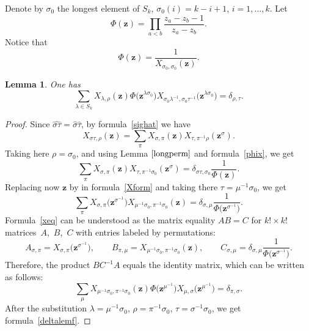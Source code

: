 \documentclass[10pt,a4paper]{amsart}
\numberwithin{equation}{section}
\newtheorem{Lemma}[Theorem]{Lemma}
\begin{document}
Denote by $\sigma_0$ the longest element of $S_k$, $\sigma_0(i)=k-i+1$, $i=1,\dots,k$. Let
\begin{equation*}
\Phi(\boldsymbol{z})=\prod_{a<b}\frac{z_a-z_b-1}{z_a-z_b}.
\end{equation*}
Notice that
\begin{equation}\label{phix}
\Phi(\boldsymbol{z})=\frac{1}{X_{\sigma_0,\sigma_0}(\boldsymbol{z})}.
\end{equation}
\begin{Lemma}\label{deltalem}One has
\begin{equation} \label{deltalemf}
\sum_{\lambda\in S_k} X_{\lambda,\rho}(\boldsymbol{z})\Phi\bigl(\boldsymbol{z}^{\lambda\sigma_0}\bigr)X_{\sigma_0\lambda^{-1},\sigma_0\tau^{-1}}\bigl(\boldsymbol{z}^{\lambda\sigma_0}\bigr)=\delta_{\rho,\tau}.
\end{equation}
\end{Lemma}
\begin{proof}
Since $\widehat{\sigma\tau} =\hat{\sigma}\hat{\tau}$, by formula~\eqref{sighat} we have
\begin{equation}\label{prodx}
X_{\sigma\tau,\rho}(\boldsymbol{z})=\sum_\pi X_{\sigma,\pi}(\boldsymbol{z})X_{\tau,\pi^{-1}\rho}(\boldsymbol{z}^\sigma).
\end{equation}
Taking here $\rho=\sigma_0$, and using Lemma $\ref{longperm}$ and formula~\eqref{phix}, we get
\begin{equation}\label{Xform}
\sum_\pi X_{\sigma,\pi}(\boldsymbol{z})X_{\tau,\pi^{-1}\sigma_0}(\boldsymbol{z}^\sigma)=\delta_{\sigma\tau,\sigma_0} \frac{1}{\Phi(\boldsymbol{z})}.
\end{equation}
Replacing now $\boldsymbol{z}$ by  in formula~\eqref{Xform} and taking there $\tau=\mu^{-1}\sigma_0$, we get
\begin{equation}\label{xeq}
\sum_\pi X_{\sigma,\pi}\bigl(\boldsymbol{z}^{\sigma^{-1}}\bigr)X_{\mu^{-1}\sigma_0,\pi^{-1}\sigma_0}(\boldsymbol{z} )=\delta_{\sigma,\mu} \frac{1}{\Phi\bigl(\boldsymbol{z}^{\sigma^{-1}}\bigr)}.
\end{equation}
Formula~\eqref{xeq} can be understood as the matrix equality $AB=C$ for
$k!\times k!$ matrices~$A$,~$B$,~$C$ with entries labeled by permutations:
\begin{equation*}
A_{\sigma,\pi}=X_{\sigma,\pi}\bigl(\boldsymbol{z}^{\sigma^{-1}}\bigr),\qquad B_{\pi,\mu}=X_{\mu^{-1}\sigma_0,\pi^{-1}\sigma_0}(\boldsymbol{z}),\qquad C_{\sigma,\mu}= \delta_{\sigma,\mu} \frac{1}{\Phi\bigl(\boldsymbol{z}^{\sigma^{-1}}\bigr)}.
\end{equation*}
Therefore, the product $BC^{-1}A$ equals the identity matrix, which can be written as follows:
\begin{equation*}
\sum_{\mu} X_{\mu^{-1}\sigma_0,\pi^{-1}\sigma_0}(\boldsymbol{z})\Phi\bigl(\boldsymbol{z}^{\mu^{-1}}\bigr)X_{\mu,\sigma}\bigl(\boldsymbol{z}^{\mu^{-1}}\bigr)=\delta_{\pi,\sigma}.
\end{equation*}
After the substitution
$\lambda=\mu^{-1}\sigma_0$, $\rho=\pi^{-1}\sigma_0$, $\tau=\sigma^{-1}\sigma_0$, we get formula~\eqref{deltalemf}.
\end{proof}
\end{document}
